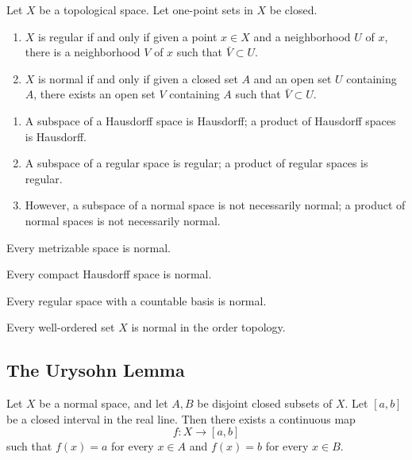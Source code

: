 \documentclass{article}
\begin{document}
    \begin{lemma}
    Let $X$ be a topological space. Let one-point sets in $X$ be closed. 
    \begin{enumerate}
        \item $X$ is regular if and only if given a point $x \in X$ and a neighborhood $U$ of $x$, there is a neighborhood $V$ of $x$ such that $\bar{V} \subset U$. 
        \item $X$ is normal if and only if given a closed set $A$ and an open set $U$ containing $A$, there exists an open set $V$ containing $A$ such that $\bar{V} \subset U$. 
    \end{enumerate}
    \end{lemma}

    \begin{theorem}
    \begin{enumerate}
        \item A subspace of a Hausdorff space is Hausdorff; a product of Hausdorff spaces is Hausdorff. 
        \item A subspace of a regular space is regular; a product of regular spaces is regular. 
        \item However, a subspace of a normal space is not necessarily normal; a product of normal spaces is not necessarily normal. 
    \end{enumerate}
    \end{theorem}

    \begin{theorem}
    Every metrizable space is normal. 
    \end{theorem}

    \begin{theorem}
    Every compact Hausdorff space is normal. 
    \end{theorem}

    \begin{theorem}
    Every regular space with a countable basis is normal. 
    \end{theorem}

    \begin{theorem}
    Every well-ordered set $X$ is normal in the order topology. 
    \end{theorem}

  \subsection{The Urysohn Lemma}

    \begin{theorem}
    Let $X$ be a normal space, and let $A, B$ be disjoint closed subsets of $X$. Let $[a,b]$ be a closed interval in the real line. Then there exists a continuous map
    \[f: X \longrightarrow [a,b]\]
    such that $f(x) = a$ for every $x \in A$ and $f(x) = b$ for every $x \in B$. 
    \end{theorem}
\end{document}
